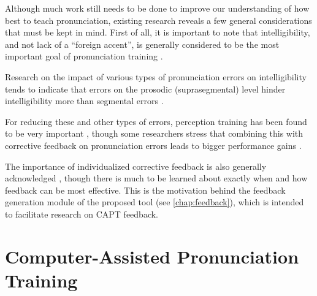 Although much work still needs to be done to improve our understanding of how best to teach pronunciation, existing research reveals a few general considerations that must be kept in mind.
	First of all, it is important to note that 
intelligibility, and not lack of a ``foreign accent'', is generally considered to be the most important goal of pronunciation training \citep{Neri2002,Derwing2005,Witt2012}.
	

Research on the impact of various types of pronunciation errors on intelligibility tends to indicate that errors on the prosodic (suprasegmental) level hinder intelligibility more than segmental errors \citep{Anderson-Hsieh1992,Derwing2005,Hirschfeld2007,Dlaska2013}. 

For reducing these and other types of errors,
perception training 
has been found to be very important \citep{Derwing2005,Hirschfeld2007},
though some researchers stress that combining this with corrective feedback on pronunciation errors leads to bigger performance gains \citep{Dlaska2013}. 

The importance of individualized corrective feedback is also generally acknowledged \citep{Neri2002,Mehlhorn2005,Dlaska2013}, 
though there is much to be learned about exactly when and how feedback can be most effective. This is the motivation behind the feedback generation module of the proposed tool (see \cref{chap:feedback}), which is intended to facilitate research on CAPT feedback.





\section{Computer-Assisted Pronunciation Training}
\label{sec:bkgd:capt}


